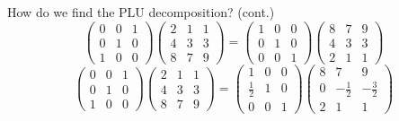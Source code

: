 \documentclass{beamer}
\begin{document}
\begin{frame}{How do we find the PLU decomposition? (cont.)}
            \pause
            \[
  \begin{pmatrix}{}
                0 & 0 & 1 \\
                0 & 1 & 0 \\
                1 & 0 & 0
            \end{pmatrix}\begin{pmatrix}{}
                2 & 1 & 1 \\
                4 & 3 & 3 \\
                8 & 7 & 9
            \end{pmatrix}
            =\begin{pmatrix}{}
                1 & 0 & 0 \\
                0 & 1 & 0 \\
                0 & 0 & 1
            \end{pmatrix}
            \begin{pmatrix}{}
                8 & 7 & 9 \\
                4 & 3 & 3 \\
                2 & 1 & 1
            \end{pmatrix}
            \]
            \pause
            \[
  \begin{pmatrix}{}
                0 & 0 & 1 \\
                0 & 1 & 0 \\
                1 & 0 & 0
            \end{pmatrix}\begin{pmatrix}{}
                2 & 1 & 1 \\
                4 & 3 & 3 \\
                8 & 7 & 9
            \end{pmatrix}
            =\begin{pmatrix}{}
                1 & 0 & 0 \\
                \frac{1}{2} & 1 & 0 \\
                0 & 0 & 1
            \end{pmatrix}
            \begin{pmatrix}{}
                8 & 7 & 9 \\
                0 & -\frac{1}{2} & -\frac{3}{2} \\
                2 & 1 & 1
            \end{pmatrix}
            \]

\end{frame}
\end{document}
